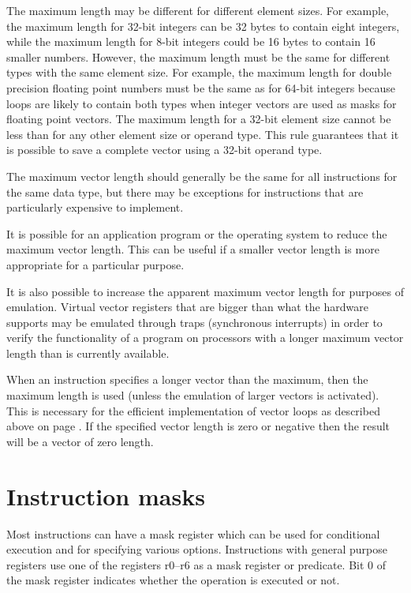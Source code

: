 \documentclass[forwardcom.tex]{subfiles}
\begin{document}
The maximum length may be different for different element sizes. For example, the maximum length for 32-bit integers can be 32 bytes to contain eight integers, while the maximum length for 8-bit integers could be 16 bytes to contain 16 smaller numbers. However, the maximum length must be the same for different types with the same element size. For example, the maximum length for double precision floating point numbers must be the same as for 64-bit integers because loops are likely to contain both types when integer vectors are used as masks for floating point vectors. The maximum length for a 32-bit element size cannot be less than for any other element size or operand type. This rule guarantees that it is possible to save a complete vector using a 32-bit operand type.
\vv

The maximum vector length should generally be the same for all instructions for the same data type, but there may be exceptions for instructions that are particularly expensive to implement. 
\vv

It is possible for an application program or the operating system to reduce the maximum vector length. This can be useful if a smaller vector length is more appropriate for a particular purpose.
\vv

It is also possible to increase the apparent maximum vector length for purposes of emulation. Virtual vector registers that are bigger than what the hardware supports may be emulated through traps (synchronous interrupts) in order to verify the functionality of a program on processors with a longer maximum vector length than is currently available.
\vv

When an instruction specifies a longer vector than the maximum, then the maximum length is used (unless the emulation of larger vectors is activated). This is necessary for the efficient implementation of vector loops as described above on page \pageref{vectorLoops}.
If the specified vector length is zero or negative then the result will be a vector of zero length.

\section{Instruction masks}
Most instructions can have a mask register which can be used for conditional execution and for specifying various options. Instructions with general purpose registers use one of the registers r0--r6 as a mask register or predicate. Bit 0 of the mask register indicates whether the operation is executed or not.
\vv
\end{document}
